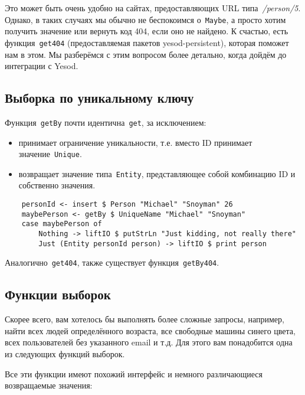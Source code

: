 Это может быть очень удобно на сайтах, предоставляющих URL
типа~\emph{/person/5}. Однако, в таких случаях мы обычно не беспокоимся
о~\lstinline'Maybe', а просто хотим получить значение или вернуть код 404, если
оно не найдено. К счастью, есть функция~\lstinline'get404' (предоставляемая
пакетов yesod-persistent), которая поможет нам в этом. Мы разберёмся с этим
вопросом более детально, когда дойдём до интеграции с Yesod.

\subsection{Выборка по уникальному ключу}

Функция~\lstinline'getBy' почти идентична~\lstinline'get', за исключением:
\begin{itemize}
    \item принимает ограничение уникальности, т.е. вместо ID принимает
        значение~\lstinline'Unique'.

    \item возвращает значение типа~\lstinline'Entity', представляющее собой
        комбинацию ID и собственно значения.
\end{itemize}

\begin{lstlisting}
    personId <- insert $ Person "Michael" "Snoyman" 26
    maybePerson <- getBy $ UniqueName "Michael" "Snoyman"
    case maybePerson of
        Nothing -> liftIO $ putStrLn "Just kidding, not really there"
        Just (Entity personId person) -> liftIO $ print person
\end{lstlisting}

Аналогично~\lstinline'get404', также существует функция~\lstinline'getBy404'.

\subsection{Функции выборок}

Скорее всего, вам хотелось бы выполнять более сложные запросы, например, найти
всех людей определённого возраста, все свободные машины синего цвета, всех
пользователей без указанного email и т.д. Для этого вам понадобится одна из
следующих функций выборок.

Все эти функции имеют похожий интерфейс и немного различающиеся возвращаемые
значения:

